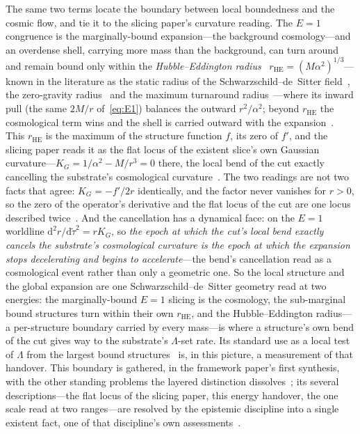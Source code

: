 \documentclass[11pt,a4paper]{article}
\theoremstyle{definition}
\begin{document}
The same two terms locate the boundary between local boundedness and the cosmic flow, and tie it to the slicing paper's curvature reading. The $E=1$ congruence is the marginally-bound expansion---the background cosmology---and an overdense shell, carrying more mass than the background, can turn around and remain bound only within the \emph{Hubble--Eddington radius}~\cite{Eddington1933} $r_{\mathrm{HE}}=(M\alpha^{2})^{1/3}$---known in the literature as the static radius of the Schwarzschild--de~Sitter field~\cite{StuchlikHledik1999}, the zero-gravity radius~\cite{Chernin2001} and the maximum turnaround radius~\cite{PavlidouTomaras2014}---where its inward pull (the same $2M/r$ of~\eqref{eq:E1}) balances the outward $r^{2}/\alpha^{2}$; beyond $r_{\mathrm{HE}}$ the cosmological term wins and the shell is carried outward with the expansion~\cite{PavlidouTomaras2014}. This $r_{\mathrm{HE}}$ is the maximum of the structure function $f$, its zero of $f'$, and the slicing paper reads it as the flat locus of the existent slice's own Gaussian curvature---$K_{G}=1/\alpha^{2}-M/r^{3}=0$ there, the local bend of the cut exactly cancelling the substrate's cosmological curvature~\cite{JanzenSlicing}. The two readings are not two facts that agree: $K_{G}=-f'/2r$ identically, and the factor never vanishes for $r>0$, so the zero of the operator's derivative and the flat locus of the cut are one locus described twice~\cite{JanzenSlicing}. And the cancellation has a dynamical face: on the $E=1$ worldline $\mathrm{d}^{2}r/\mathrm{d}\tilde\tau^{2}=rK_{G}$, so \emph{the epoch at which the cut's local bend exactly cancels the substrate's cosmological curvature is the epoch at which the expansion stops decelerating and begins to accelerate}---the bend's cancellation read as a cosmological event rather than only a geometric one. So the local structure and the global expansion are one Schwarzschild--de~Sitter geometry read at two energies: the marginally-bound $E=1$ slicing is the cosmology, the sub-marginal bound structures turn within their own $r_{\mathrm{HE}}$, and the Hubble--Eddington radius---a per-structure boundary carried by every mass---is where a structure's own bend of the cut gives way to the substrate's $\Lambda$-set rate. Its standard use as a local test of $\Lambda$ from the largest bound structures~\cite{PavlidouTomaras2014} is, in this picture, a measurement of that handover. This boundary is gathered, in the framework paper's first synthesis, with the other standing problems the layered distinction dissolves~\cite{JanzenCRframework}; its several descriptions---the flat locus of the slicing paper, this energy handover, the one scale read at two ranges---are resolved by the epistemic discipline into a single existent fact, one of that discipline's own assessments~\cite{JanzenShadowExistence}.
\end{document}
